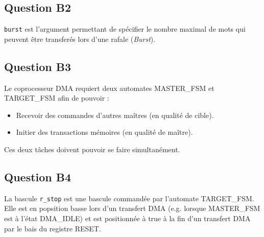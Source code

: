 \documentclass[10pt]{article}
\begin{document}
\subsection{Question B2}
\texttt{burst} est l'argument permettant de spécifier le nombre maximal de mots
qui peuvent être transferés lors d'une rafale (\textit{Burst}).

\subsection{Question B3}
Le coprocesseur DMA requiert deux automates MASTER\_FSM et TARGET\_FSM afin de
pouvoir :
\begin{itemize}
  \item Recevoir des commandes d'autres maîtres (en qualité de cible).
  \item Initier des transactions mémoires (en qualité de maître).
\end{itemize}
Ces deux tâches doivent pouvoir se faire simultanément.

\subsection{Question B4}
La bascule \texttt{r\_stop} est une bascule commandée par l'automate
TARGET\_FSM. Elle est en popsition basse lors d'un transfert DMA (e.g. lorsque
MASTER\_FSM est à l'état DMA\_IDLE) et est positionnée à true à la fin d'un
transfert DMA par le bais du registre RESET.
\end{document}
